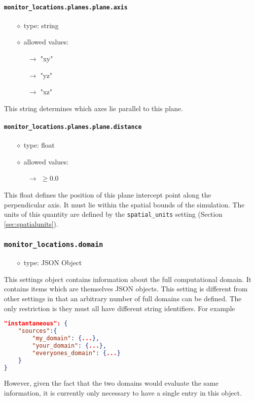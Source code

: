 \documentclass[]{article}
\def\code#1{\texttt{#1}}
\begin{document}
\paragraph{\code{monitor\_locations.planes.plane.axis}}
\begin{itemize}
    \item[$\diamond$] type: string 
    \item[$\diamond$] allowed values:
    \begin{itemize}
        \item[$\rightarrow$] "xy"
        \item[$\rightarrow$] "yz"
        \item[$\rightarrow$] "xz"
    \end{itemize}
\end{itemize}
This string determines which axes lie parallel to this plane.

\paragraph{\code{monitor\_locations.planes.plane.distance}}
\begin{itemize}
    \item[$\diamond$] type: float 
    \item[$\diamond$] allowed values:
    \begin{itemize}
        \item[$\rightarrow$] $\geq0.0$ 
    \end{itemize}
\end{itemize}
This float defines the position of this plane intercept point along the
perpendicular axis. It must lie within the spatial bounds of the simulation. The
units of this quantity are defined by the \code{spatial\_units} setting (Section
\ref{sec:spatialunits}).

\subsubsection{\code{monitor\_locations.domain}}\label{sec:mondomain}
\begin{itemize}
    \item[$\diamond$] type: JSON Object 
\end{itemize}
This settings object contains information about the full computational domain.
It contains items which are themselves JSON objects. This setting is different
from other settings in that an arbitrary number of full domains can be defined.
The only restriction is they must all have different string identifiers. For
example\\
\begin{lstlisting}[language=json,firstnumber=1]
"instantaneous": {
    "sources":{
        "my_domain": {...},
        "your_domain": {...},
        "everyones_domain": {...}
    }
}
\end{lstlisting}
However, given the fact that the two domains would evaluate the same
information, it is currently only necessary to have a single entry in this
object.
\end{document}
